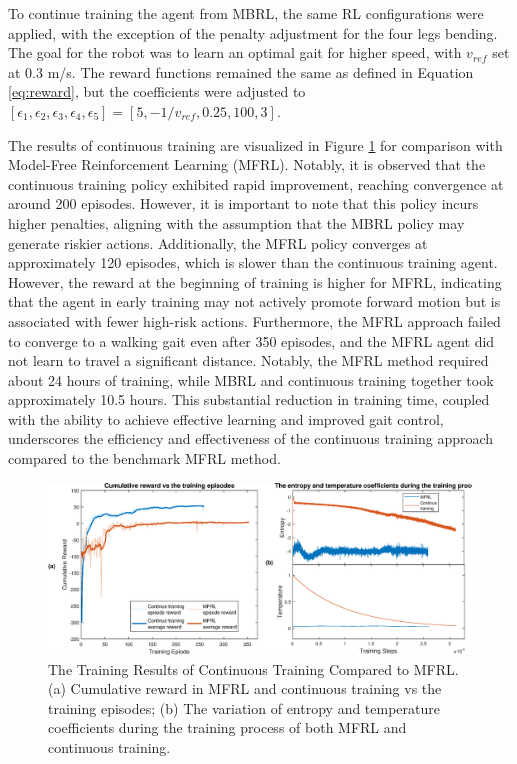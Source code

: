 To continue training the agent from MBRL, the same RL configurations were applied, with the exception of the penalty adjustment for the four legs bending. The goal for the robot was to learn an optimal gait for higher speed, with $v_{ref}$ set at 0.3 m/s. The reward functions remained the same as defined in Equation \ref{eq:reward}, but the coefficients were adjusted to $[\epsilon_1, \epsilon_2, \epsilon_3, \epsilon_4, \epsilon_5] = [5, −1/v_{ref}, 0.25, 100, 3]$. 

The results of continuous training are visualized in Figure \ref{fig:MFRLvsCT} for comparison with Model-Free Reinforcement Learning (MFRL). Notably, it is observed that the continuous training policy exhibited rapid improvement, reaching convergence at around 200 episodes. However, it is important to note that this policy incurs higher penalties, aligning with the assumption that the MBRL policy may generate riskier actions. Additionally, the MFRL policy converges at approximately 120 episodes, which is slower than the continuous training agent. However, the reward at the beginning of training is higher for MFRL, indicating that the agent in early training may not actively promote forward motion but is associated with fewer high-risk actions. Furthermore, the MFRL approach failed to converge to a walking gait even after 350 episodes, and the MFRL agent did not learn to travel a significant distance. Notably, the MFRL method required about 24 hours of training, while MBRL and continuous training together took approximately 10.5 hours. This substantial reduction in training time, coupled with the ability to achieve effective learning and improved gait control, underscores the efficiency and effectiveness of the continuous training approach compared to the benchmark MFRL method.

\begin{figure}[htb]
    \centering
    \includegraphics[width=\linewidth]{img/chap5/MFRLvsCT.eps}
    \caption{The Training Results of Continuous Training Compared to MFRL. (a) Cumulative reward in MFRL and continuous training vs the training episodes; (b) The variation of entropy and temperature coefficients during the training process of both MFRL and continuous training.}
    \label{fig:MFRLvsCT}
\end{figure}

